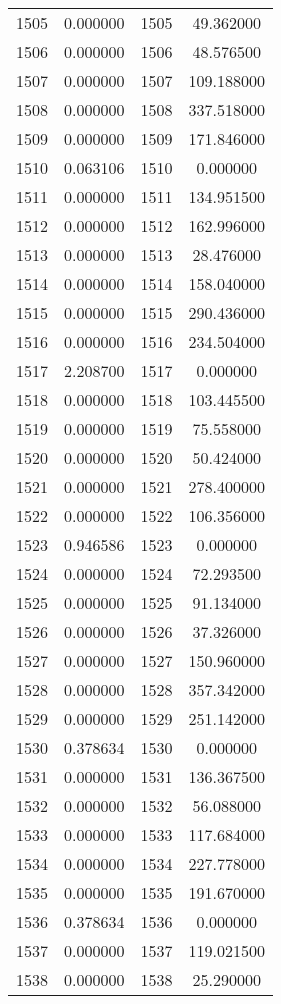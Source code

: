 \documentclass[12pt]{article}
\begin{document}
\begin{longtable}{@{}cccc@{}}
1505 & 0.000000 & 1505 & 49.362000 \\
1506 & 0.000000 & 1506 & 48.576500 \\
1507 & 0.000000 & 1507 & 109.188000 \\
1508 & 0.000000 & 1508 & 337.518000 \\
1509 & 0.000000 & 1509 & 171.846000 \\
1510 & 0.063106 & 1510 & 0.000000 \\
1511 & 0.000000 & 1511 & 134.951500 \\
1512 & 0.000000 & 1512 & 162.996000 \\
1513 & 0.000000 & 1513 & 28.476000 \\
1514 & 0.000000 & 1514 & 158.040000 \\
1515 & 0.000000 & 1515 & 290.436000 \\
1516 & 0.000000 & 1516 & 234.504000 \\
1517 & 2.208700 & 1517 & 0.000000 \\
1518 & 0.000000 & 1518 & 103.445500 \\
1519 & 0.000000 & 1519 & 75.558000 \\
1520 & 0.000000 & 1520 & 50.424000 \\
1521 & 0.000000 & 1521 & 278.400000 \\
1522 & 0.000000 & 1522 & 106.356000 \\
1523 & 0.946586 & 1523 & 0.000000 \\
1524 & 0.000000 & 1524 & 72.293500 \\
1525 & 0.000000 & 1525 & 91.134000 \\
1526 & 0.000000 & 1526 & 37.326000 \\
1527 & 0.000000 & 1527 & 150.960000 \\
1528 & 0.000000 & 1528 & 357.342000 \\
1529 & 0.000000 & 1529 & 251.142000 \\
1530 & 0.378634 & 1530 & 0.000000 \\
1531 & 0.000000 & 1531 & 136.367500 \\
1532 & 0.000000 & 1532 & 56.088000 \\
1533 & 0.000000 & 1533 & 117.684000 \\
1534 & 0.000000 & 1534 & 227.778000 \\
1535 & 0.000000 & 1535 & 191.670000 \\
1536 & 0.378634 & 1536 & 0.000000 \\
1537 & 0.000000 & 1537 & 119.021500 \\
1538 & 0.000000 & 1538 & 25.290000 \\

\end{longtable}
\end{document}

